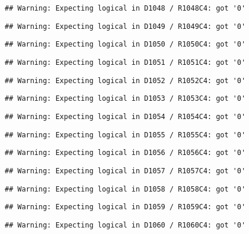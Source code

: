 \documentclass[
]{article}
\begin{document}
\begin{verbatim}
## Warning: Expecting logical in D1048 / R1048C4: got '0'
\end{verbatim}

\begin{verbatim}
## Warning: Expecting logical in D1049 / R1049C4: got '0'
\end{verbatim}

\begin{verbatim}
## Warning: Expecting logical in D1050 / R1050C4: got '0'
\end{verbatim}

\begin{verbatim}
## Warning: Expecting logical in D1051 / R1051C4: got '0'
\end{verbatim}

\begin{verbatim}
## Warning: Expecting logical in D1052 / R1052C4: got '0'
\end{verbatim}

\begin{verbatim}
## Warning: Expecting logical in D1053 / R1053C4: got '0'
\end{verbatim}

\begin{verbatim}
## Warning: Expecting logical in D1054 / R1054C4: got '0'
\end{verbatim}

\begin{verbatim}
## Warning: Expecting logical in D1055 / R1055C4: got '0'
\end{verbatim}

\begin{verbatim}
## Warning: Expecting logical in D1056 / R1056C4: got '0'
\end{verbatim}

\begin{verbatim}
## Warning: Expecting logical in D1057 / R1057C4: got '0'
\end{verbatim}

\begin{verbatim}
## Warning: Expecting logical in D1058 / R1058C4: got '0'
\end{verbatim}

\begin{verbatim}
## Warning: Expecting logical in D1059 / R1059C4: got '0'
\end{verbatim}

\begin{verbatim}
## Warning: Expecting logical in D1060 / R1060C4: got '0'
\end{verbatim}
\end{document}
